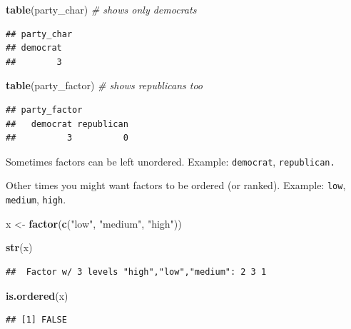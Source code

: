 \documentclass[
]{book}
\newenvironment{Shaded}{\begin{snugshade}}{\end{snugshade}}
\newcommand{\CommentTok}[1]{\textcolor[rgb]{0.56,0.35,0.01}{\textit{#1}}}
\newcommand{\FunctionTok}[1]{\textcolor[rgb]{0.13,0.29,0.53}{\textbf{#1}}}
\newcommand{\NormalTok}[1]{#1}
\newcommand{\OtherTok}[1]{\textcolor[rgb]{0.56,0.35,0.01}{#1}}
\newcommand{\StringTok}[1]{\textcolor[rgb]{0.31,0.60,0.02}{#1}}
\begin{document}
\begin{Shaded}
\begin{Highlighting}[]
\FunctionTok{table}\NormalTok{(party\_char) }\CommentTok{\# shows only democrats}
\end{Highlighting}
\end{Shaded}

\begin{verbatim}
## party_char
## democrat 
##        3
\end{verbatim}

\begin{Shaded}
\begin{Highlighting}[]
\FunctionTok{table}\NormalTok{(party\_factor) }\CommentTok{\# shows republicans too}
\end{Highlighting}
\end{Shaded}

\begin{verbatim}
## party_factor
##   democrat republican 
##          3          0
\end{verbatim}

Sometimes factors can be left unordered. Example: \texttt{democrat}, \texttt{republican.}

Other times you might want factors to be ordered (or ranked). Example: \texttt{low}, \texttt{medium}, \texttt{high}.

\begin{Shaded}
\begin{Highlighting}[]
\NormalTok{x }\OtherTok{\textless{}{-}} \FunctionTok{factor}\NormalTok{(}\FunctionTok{c}\NormalTok{(}\StringTok{"low"}\NormalTok{, }\StringTok{"medium"}\NormalTok{, }\StringTok{"high"}\NormalTok{))}

\FunctionTok{str}\NormalTok{(x)}
\end{Highlighting}
\end{Shaded}

\begin{verbatim}
##  Factor w/ 3 levels "high","low","medium": 2 3 1
\end{verbatim}

\begin{Shaded}
\begin{Highlighting}[]
\FunctionTok{is.ordered}\NormalTok{(x)}
\end{Highlighting}
\end{Shaded}

\begin{verbatim}
## [1] FALSE
\end{verbatim}
\end{document}
